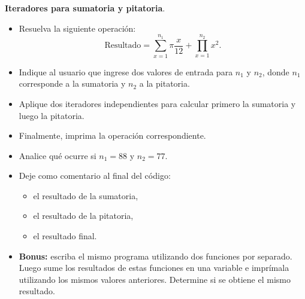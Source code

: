 \item \textbf{Iteradores para sumatoria y pitatoria}.

\begin{tcolorbox}[colback=blue!2!white,colframe=blue!55!black,title={Enunciado}]
\begin{itemize}
    \item Resuelva la siguiente operación:
    \[
    \text{Resultado}=\sum_{x=1}^{n_1} \pi \frac{x}{12}+\prod_{x=1}^{n_2} x^{2}.
    \]
    \item Indique al usuario que ingrese dos valores de entrada para \(n_1\) y \(n_2\), donde \(n_1\) corresponde a la sumatoria y \(n_2\) a la pitatoria.
    \item Aplique dos iteradores independientes para calcular primero la sumatoria y luego la pitatoria.
    \item Finalmente, imprima la operación correspondiente.
    \item Analice qué ocurre si \(n_1=88\) y \(n_2=77\).
    \item Deje como comentario al final del código:
    \begin{itemize}
        \item el resultado de la sumatoria,
        \item el resultado de la pitatoria,
        \item el resultado final.
    \end{itemize}
    \item \textbf{Bonus:} escriba el mismo programa utilizando dos funciones por separado. Luego sume los resultados de estas funciones en una variable e imprímala utilizando los mismos valores anteriores. Determine si se obtiene el mismo resultado.
\end{itemize}
\end{tcolorbox}

